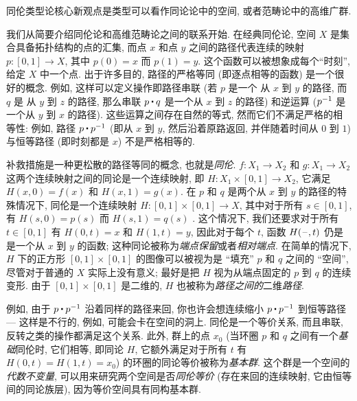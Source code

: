 同伦类型论核心新观点是类型可以看作同论论中的空间, 或者范畴论中的高维广群. 

我们从简要介绍同伦论和高维范畴论之间的联系开始. 在经典同伦论, 空间 $X$ 是集合具备拓扑结构的点的汇集, 
而点 $x$ 和点 $y$ 之间的路径代表连续的映射 $p : [0,1] \to X$, 其中 $p(0) = x$ 而 $p(1) = y$. 
这个函数可以被想象成每个``时刻'', 给定 $X$ 中一个点. 出于许多目的, 路径的严格等同 (即逐点相等的函数) 是一个很好的概念. 例如, 这样可以定义操作即路径串联 (若 $p$ 是一个 从 $x$ 到 $y$ 的路径, 而 $q$ 是 从 $y$ 到 $z$ 的路径, 那么串联 $p \ct q$ 是一个从 $x$ 到 $z$ 的路径) 和逆运算 ($\mathord{{p}^{-1}}$ 是一个从 $y$ 到 $x$ 的路径).
 这些运算之间存在自然的等式, 然而它们不满足严格的相等性: 例如, 路径 $p \ct \opp p$ (即从 $x$ 到 $y$, 然后沿着原路返回, 并伴随着时间从 $0$ 到 $1$) 与恒等路径 (即时刻都是 $x$) 不是严格相等的. 

补救措施是一种更松散的路径等同的概念, 也就是\emph{同伦}.
$f : X_1 \to X_2$ 和 $g : X_1\to X_2$ 这两个连续映射之间的同论是一个连续映射, 即 $H : X_1 \times [0, 1] \to X_2$, 它满足 $H(x, 0) = f (x)$ 和 $H(x, 1) = g(x)$.
 在 $p$ 和 $q$ 是两个从 $x$ 到 $y$ 的路径的特殊情况下, 同伦是一个连续映射 $H : [0,1] \times [0,1] \rightarrow X$, 其中对于所有 $s\in [0,1]$, 有 $H(s,0) = p(s)$ 而 $H(s,1) = q(s)$ . 这个情况下, 我们还要求对于所有 $t\in [0,1]$ 有 $H(0,t) = x$ 和 $H(1,t)=y$, 因此对于每个 $t$, 函数 $H(\mathord{\hspace{1pt}\text{--}\hspace{1pt}},t)$ 仍是是一个从 $x$ 到 $y$ 的函数; 这种同论被称为\emph{端点保留}或者\emph{相对端点}. 在简单的情况下, $H$ 下的正方形 $[0,1]\times [0,1]$ 的图像可以被视为是 ``填充''  $p$ 和 $q$ 之间的 ``空间'', 尽管对于普通的 $X$ 实际上没有意义; 最好是把 $H$ 视为从端点固定的 $p$ 到 $q$ 的连续变形. 由于 $[0,1]\times [0,1]$ 是二维的, $H$ 也被称为\emph{路径之间的}二维\emph{路径}. 

例如, 由于 $p \ct \opp p$ 沿着同样的路径来回, 你也许会想连续缩小 $p \ct \opp p$ 到恒等路径 --- 这样是不行的, 例如, 可能会卡在空间的洞上. 同伦是一个等价关系, 而且串联, 反转之类的操作都满足这个关系. 此外, 群上的点 $x_0$ (当环圈 $p$ 和 $q$ 之间有一个\emph{基础}同伦时, 它们相等, 即同论 $H$, 它额外满足对于所有 $t$ 有 $H(0,t) = H(1,t) = x_0$) 的环圈的同论等价被称为\emph{基本群}. 这个群是一个空间的\emph{代数不变量}, 可以用来研究两个空间是否\emph{同伦等价} (存在来回的连续映射, 它由恒等间的同论族层), 因为等价空间具有同构基本群. 

